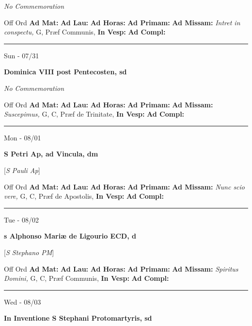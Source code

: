 \documentclass[letterpaper, 10pt]{article}
\begin{document}
\textit{No Commemoration}\begin{justify}
Off Ord
\textbf{Ad Mat: }
\textbf{Ad Lau: }
\textbf{Ad Horas: }
\textbf{Ad Primam: }
\textbf{Ad Missam:} \textit{Intret in conspectu, } G, Præf Communis, 
\textbf{In Vesp: }
\textbf{Ad Compl: }\end{justify}



\hrule
\begin{center}
Sun - 07/31
\end{center}\textbf{ \large Dominica VIII post Pentecosten, \textnormal{\normalsize sd}}

\textit{No Commemoration}\begin{justify}
Off Ord
\textbf{Ad Mat: }
\textbf{Ad Lau: }
\textbf{Ad Horas: }
\textbf{Ad Primam: }
\textbf{Ad Missam:} \textit{Suscepimus, } G, C, Præf de Trinitate, 
\textbf{In Vesp: }
\textbf{Ad Compl: }\end{justify}



\hrule
\begin{center}
Mon - 08/01
\end{center}\textbf{ \large S Petri Ap, ad Vincula, \textnormal{\normalsize dm}}

[\textit{S Pauli Ap}]
\begin{justify}
Off Ord
\textbf{Ad Mat: }
\textbf{Ad Lau: }
\textbf{Ad Horas: }
\textbf{Ad Primam: }
\textbf{Ad Missam:} \textit{Nunc scio vere, } G, C, Præf de Apostolis, 
\textbf{In Vesp: }
\textbf{Ad Compl: }\end{justify}



\hrule
\begin{center}
Tue - 08/02
\end{center}\textbf{ \large s Alphonso Mariæ de Ligourio ECD, \textnormal{\normalsize d}}

[\textit{S Stephano PM}]
\begin{justify}
Off Ord
\textbf{Ad Mat: }
\textbf{Ad Lau: }
\textbf{Ad Horas: }
\textbf{Ad Primam: }
\textbf{Ad Missam:} \textit{Spiritus Domini, } G, C, Præf Communis, 
\textbf{In Vesp: }
\textbf{Ad Compl: }\end{justify}



\hrule
\begin{center}
Wed - 08/03
\end{center}\textbf{ \large In Inventione S Stephani Protomartyris, \textnormal{\normalsize sd}}
\end{document}
